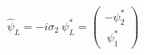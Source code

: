 \begin{equation}
\hat{\psi}_{L} = -i\sigma_{2}~ \psi_{L}^{\ast} = \left(
\begin{array}{c}
-\psi_{2}^{\ast}\\
~\psi_{1}^{\ast}
\end{array}
\right)
\end{equation}

